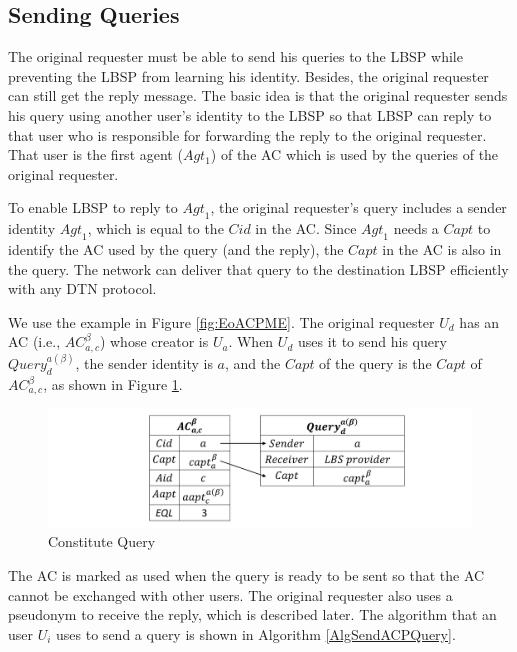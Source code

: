 \subsection{ Sending Queries}

\noindent The original requester must be able to send his queries to the LBSP while preventing the LBSP from learning his identity. Besides, the original requester can still get the reply message. The basic idea is that the original requester sends his query using another user's identity to the LBSP so that LBSP can reply to that user who is responsible for forwarding the reply to the original requester. That user is the first agent ($Agt_1$) of the AC which is used by the queries of the original requester.

To enable LBSP to reply to ${Agt}_1$, the original requester's query includes a sender identity ${Agt}_1$, which is equal to the $Cid$ in the AC. Since ${Agt}_1$ needs a ${Capt}$ to identify the AC used by the query (and the reply), the ${Capt}$ in the AC is also in the query. The network can deliver that query to the destination LBSP efficiently with any DTN protocol.

We use the example in Figure \ref{fig:EoACPME}. The original requester $U_d$ has an AC (i.e., ${AC}^{\beta }_{a,c}$) whose creator is $U_a$. When $U_d$ uses it to send his query ${Query}^{a\left(\beta\right)}_d$, the sender identity is $a$, and the $Capt$ of the query is the $Capt$ of ${AC}^{\beta }_{a,c}$, as shown in Figure \ref{fig:ConstituteQuery}.

\begin{figure} [H]
  \centering 
  \includegraphics[width=6.0in]{figures/FIG_4_5_Constitute_Query.png}
  \caption{Constitute Query} 
  \label{fig:ConstituteQuery} %
\end{figure}

The AC is marked as used when the query is ready to be sent so that the AC cannot be exchanged with other users. The original requester also uses a pseudonym to receive the reply, which is described later. The algorithm that an user $U_i$ uses to send a query is shown in Algorithm \ref{AlgSendACPQuery}.


